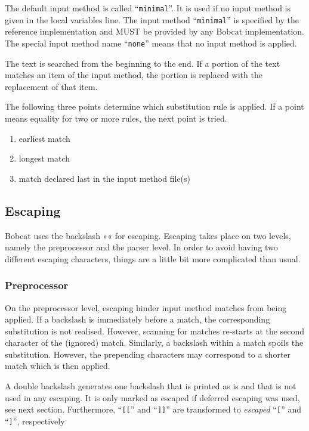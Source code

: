 \documentclass[12pt,openany]{book}
\begin{document}
The default input method is called ``\verb|minimal|''.  It is used if no input
method is given in the local variables line.  The input method
``\verb|minimal|'' is specified by the reference implementation and MUST be
provided by any Bobcat implementation.  The special input method name
``\verb|none|'' means that no input method is applied.

The text is searched from the beginning to the end.  If a portion of the text
matches an item of the input method, the portion is replaced with the
replacement of that item.

The following three points determine which substitution rule is applied.  If a
point means equality for two or more rules, the next point is tried.

\begin{enumerate}
\item earliest match
\item longest match
\item match declared last in the input method file(s)
\end{enumerate}

\subsection{Escaping}

Bobcat uses the backslash »« for escaping.  Escaping takes place on two
levels, namely the preprocessor and the parser level.  In order to avoid having
two different escaping characters, things are a little bit more complicated
than usual.

\subsubsection*{Preprocessor}

On the preprocessor level, escaping hinder input method matches from being
applied.  If a backslash is immediately before a match, the corresponding
substitution is not realised.  However, scanning for matches re-starts at the
second character of the (ignored) match.  Similarly, a backslash within a match
spoils the substitution.  However, the prepending characters may correspond to
a shorter match which is then applied.

A double backslash generates one backslash that is printed as is and that is
not used in any escaping.  It is only marked as escaped if deferred escaping
was used, see next section.  Furthermore, ``\verb|[[|'' and ``\verb|]]|'' are
transformed to \emph{escaped} ``\verb|[|'' and ``\verb|]|'', respectively
\end{document}
